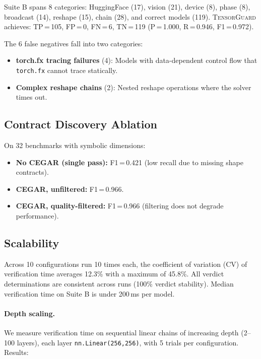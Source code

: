 \documentclass[11pt]{article}
\begin{document}
Suite B spans 8 categories: HuggingFace (17), vision (21),
device (8), phase (8), broadcast (14), reshape (15), chain (28),
and correct models (119).  \textsc{TensorGuard} achieves:
TP\,=\,105, FP\,=\,0, FN\,=\,6, TN\,=\,119
(P\,=\,1.000, R\,=\,0.946, F1\,=\,0.972).

The 6 false negatives fall into two categories:
\begin{itemize}[leftmargin=2em]
  \item \textbf{torch.fx tracing failures} (4): Models with
    data-dependent control flow that \texttt{torch.fx} cannot
    trace statically.
  \item \textbf{Complex reshape chains} (2): Nested reshape
    operations where the solver times out.
\end{itemize}


\subsection{Contract Discovery Ablation}\label{sec:ablation}

On 32 benchmarks with symbolic dimensions:
\begin{itemize}[leftmargin=2em]
  \item \textbf{No CEGAR (single pass):} F1\,=\,0.421
    (low recall due to missing shape contracts).
  \item \textbf{CEGAR, unfiltered:} F1\,=\,0.966.
  \item \textbf{CEGAR, quality-filtered:} F1\,=\,0.966
    (filtering does not degrade performance).
\end{itemize}


\subsection{Scalability}\label{sec:scalability}

Across 10 configurations run 10 times each, the coefficient of
variation (CV) of verification time averages 12.3\% with a maximum
of 45.8\%.  All verdict determinations are consistent across runs
(100\% verdict stability).  Median verification time on Suite B
is under 200\,ms per model.

\paragraph{Depth scaling.}
We measure verification time on sequential linear chains of
increasing depth (2--100 layers), each layer \texttt{nn.Linear(256,256)},
with 5 trials per configuration.  Results:
\end{document}
